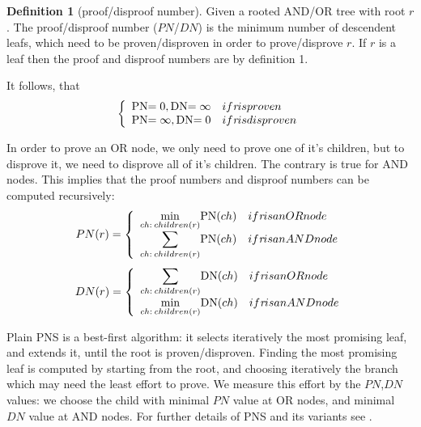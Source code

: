 \documentclass[conference]{IEEEtran}
\theoremstyle{definition}
\newtheorem{definition}{Definition}[section]
\newcommand{\pn}{$PN$\xspace}
\newcommand{\dn}{$DN$\xspace}
\begin{document}
\begin{definition}[proof/disproof number]
Given a rooted AND/OR tree with root $r$. The proof/disproof number (\pn/\dn) is the minimum number of descendent leafs, which need to be proven/disproven in order to prove/disprove $r$. If $r$ is a leaf 
then the proof and disproof numbers are by definition 1.
\end{definition}

It follows, that
\begin{align*}
\left\{
	\begin{array}{ll}
		\pn=0,\, \dn=\infty  & \mbox{if \textit{r} is proven}\\
		\pn=\infty,\, \dn=0  & \mbox{if \textit{r} is disproven}\\
	\end{array}
\right.
\end{align*}

In order to prove an OR node, we only need to prove one of it's children, but to disprove it, we need to disprove all of it's children.
The contrary is true for AND nodes.
This implies that the proof numbers and disproof numbers can be computed recursively:
\begin{align*}
PN(r) =
\left\{
	\begin{array}{ll}
		\displaystyle \min_{ch: \:  children(r)}\pn(ch)  & \mbox{if \textit{r} is an OR node}\\
		\displaystyle \sum_{ch: \:  children(r)}\pn(ch)  & \mbox{if \textit{r} is an AND node}\\
	\end{array}
\right.
\end{align*}
\begin{align*}
DN(r) =
\left\{
	\begin{array}{ll}
		\displaystyle \sum_{ch: \:  children(r)}\dn(ch)  & \mbox{if \textit{r} is an OR node}\\
		\displaystyle \min_{ch: \:  children(r)}\dn(ch)  & \mbox{if \textit{r} is an AND node}\\
	\end{array}
\right.
\end{align*}

Plain PNS is a best-first algorithm: it selects iteratively the most promising leaf, and extends it, until the root is proven/disproven.
Finding the most promising leaf is computed by starting from the root, and choosing iteratively the branch which may need the least effort to prove.
We measure this effort by the \pn,\dn values: we choose the child with minimal \pn value at OR nodes, and minimal \dn value at AND nodes. For further details of PNS and its variants see \cite{PNS_variants}.
\end{document}
